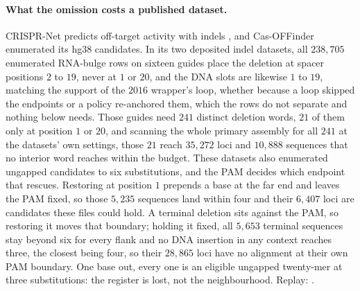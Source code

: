 \paragraph{What the omission costs a published dataset.}
CRISPR-Net predicts off-target activity with indels \citep{lin2020crisprnet}, and Cas-OFFinder
enumerated its hg38 candidates. In its two deposited indel datasets, all $238{,}705$ enumerated
RNA-bulge rows on sixteen guides place the deletion at spacer positions $2$ to $19$, never at
$1$ or $20$, and the DNA slots are likewise $1$ to $19$, matching the support of the $2016$
wrapper's loop, whether because a loop skipped the endpoints or a policy re-anchored them,
which the rows do not separate and nothing below needs. Those guides need $241$ distinct deletion
words, $21$ of them only at position $1$ or $20$, and scanning the whole primary assembly for
all $241$ at the datasets' own settings, those $21$ reach $35{,}272$ loci and $10{,}888$
sequences that no interior word reaches within the budget. These datasets also enumerated ungapped candidates to six
substitutions, and the PAM decides which endpoint that rescues. Restoring at position $1$
prepends a base at the far end and leaves the PAM fixed, so those $5{,}235$ sequences land
within four and their $6{,}407$ loci are candidates these files could hold. A terminal deletion
sits against the PAM, so restoring it moves that boundary; holding it fixed, all $5{,}653$
terminal sequences stay beyond six for every flank and no DNA insertion in any context reaches
three, the closest being four, so their $28{,}865$ loci have no alignment at their own PAM
boundary. One base out, every one is an eligible ungapped twenty-mer at three substitutions: the
register is lost, not the neighbourhood. Replay: .

